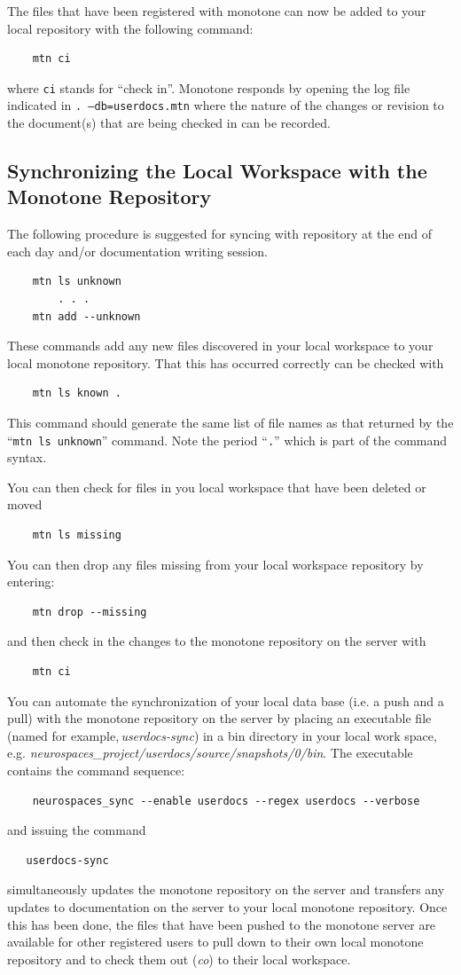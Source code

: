 \documentclass[12pt]{article}
\begin{document}
The files that have been registered with monotone can now be added to your local repository with the following command:
\begin{verbatim}
    mtn ci
\end{verbatim}
where {\tt ci} stands for ``check in''. Monotone responds by opening the log file indicated in {\tt .\,--db=userdocs.mtn} where the nature of the changes or revision to the document(s) that are being checked in can be recorded.

\subsection{Synchronizing the Local Workspace with the Monotone Repository}

The following procedure is suggested for syncing with repository at the end of each day and/or documentation writing session.

\begin{verbatim}
    mtn ls unknown
        . . .
    mtn add --unknown
\end{verbatim}
These commands add any new files discovered in your local workspace to your local monotone repository. That this has occurred correctly can be checked with
\begin{verbatim}
    mtn ls known .
\end{verbatim}
This command should generate the same list of file names as that returned by the ``{\tt mtn ls unknown}'' command. Note the period ``{\tt .}'' which is part of the command syntax.

You can then check for files in you local workspace that have been deleted or moved
\begin{verbatim}
    mtn ls missing
\end{verbatim}
You can then drop any files missing from your local workspace repository by entering:
\begin{verbatim}
    mtn drop --missing
\end{verbatim}
and then check in the changes to the monotone repository on the server with
\begin{verbatim}
    mtn ci
\end{verbatim}
You can automate the synchronization of your local data base (i.e. a push and a pull) with the monotone repository on the server by placing an executable file (named for example,\,{\it userdocs-sync}) in a bin directory in your local work space, e.g. {\it neurospaces\_project/userdocs/source/snapshots/0/bin}. 
The executable contains the command sequence:
\begin{verbatim}
    neurospaces_sync --enable userdocs --regex userdocs --verbose
\end{verbatim}
and issuing the command
\begin{verbatim}
   userdocs-sync
\end{verbatim}
simultaneously updates the monotone repository on the server and transfers any updates to documentation on the server to your local monotone repository. Once this has been done, the files that have been pushed to the monotone server are available for other registered users to pull down to their own local monotone repository and to check them out ({\it co}) to their local workspace.
\end{document}
